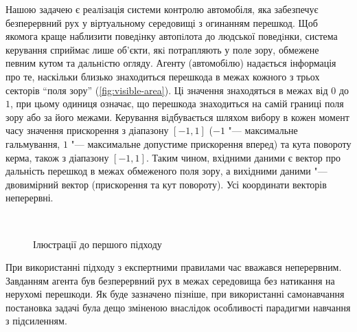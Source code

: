 \documentclass[a4paper,10pt,fleqn,draft]{article}
\begin{document}
Нашою задачею є реалізація системи контролю автомобіля, яка забезпечує безперервний рух у віртуальному середовищі з огинанням перешкод. Щоб якомога краще наблизити поведiнку автопiлота до людської поведiнки, система керування сприймає лише об’єкти, якi потрапляють у поле зору, обмежене певним кутом та дальнiстю огляду. Агенту (автомобілю) надається інформація про те, наскільки близько знаходиться перешкода в межах кожного з трьох секторів ``поля зору'' (\ref{fig:visible-area}). Ці значення знаходяться в межах від $0$ до $1$, при цьому одиниця означає, що перешкода знаходиться на самій границі поля зору або за його межами. Керування відбувається шляхом вибору в кожен момент часу значення прискорення з діапазону $[-1,1]$ ($-1$ "--- максимальне гальмування, $1$ "--- максимальне допустиме прискорення вперед) та кута повороту керма, також з діапазону $[-1,1]$. Таким чином, вхідними даними є вектор про дальність перешкод в межах обмеженого поля зору, а вихідними даними "--- двовимірний вектор (прискорення та кут повороту). Усі координати векторів неперервні. 
\begin{figure}
  \centering
  \,
  \caption{Ілюстрації до першого підходу}
  \label{fig:car-related}
\end{figure}

При використанні підходу з експертними правилами час вважався неперервним. Завданням агента був безперервний рух в межах середовища без натикання на нерухомі перешкоди. Як буде зазначено пізніше, при використанні самонавчання постановка задачі була дещо зміненою внаслідок особливості парадигми навчання з підсиленням.
\end{document}
